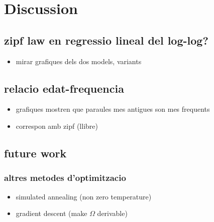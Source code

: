 \chapter{Discussion}
\section{zipf law en regressio lineal del log-log?}
\begin{itemize}
\item mirar grafiques dels dos models, variants
\end{itemize}
\section{relacio edat-frequencia}
\begin{itemize}
\item grafiques mostren que paraules mes antigues son mes frequents
\item correspon amb zipf (llibre)
\end{itemize}
\section{future work}
\subsection{altres metodes d'optimitzacio}
\begin{itemize}
\item simulated annealing (non zero temperature)
\item gradient descent (make $\Omega$ derivable)
\end{itemize}

